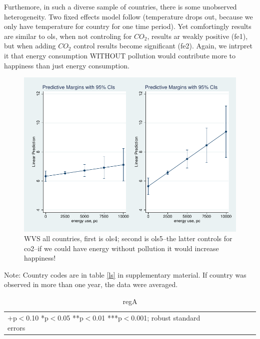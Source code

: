 \documentclass[10pt, letterpaper]{article}
\begin{document}
\begin{spacing}{1.4}
Furthemore, in such a diverse sample of countries, there is some unobserved
heterogeneity. Two fixed effects model follow (temperature drops out, because we
 only have temperature for country for one time period). Yet comfortingly
 results are similar to ols, when not controling for $CO_2$, results ar weakly
 positive (fe1), but when adding $CO_2$ control results become significant
 (fe2). Again, we intrpret it  that energy consumption WITHOUT pollution would
 contribute more to happiness than just energy consumption.  

\begin{figure}[H]
 \includegraphics[width=6in]{graphsAndTables/ols4ols5.pdf}\centering
\caption{WVS all countries, first is ols4; second is ols5--the latter controls
  for co2--if we could have energy without pollution it would increase happiness! }\label{ols4ols5}
\end{figure}
{\scriptsize Note: Country codes are in table \ref{ls} in supplementary
  material. If country was observed in more than one year, the data were averaged.}


\begin{table}[H]\centering \caption{regA} \label{regA} \begin{scriptsize} \begin{tabular}{p{1.4in}p{.43in}p{.43in}p{.43in}p{.43in}p{.43in}p{.43in}p{.43in}p{.43in}p{.43in}p{.43 in}p{.43in}p{.43 in}}\hline  \hline\multicolumn{6}{l}{+p$<$0.10 *p$<$0.05 **p$<$0.01 ***p$<$0.001; robust standard errors} \end{tabular}\end{scriptsize}\end{table}


\end{spacing}
\end{document}
